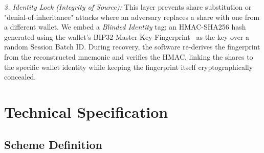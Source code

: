 \documentclass[11pt]{article}
\begin{document}
\textit{3. Identity Lock (Integrity of Source):} This layer prevents share substitution or "denial-of-inheritance" attacks where an adversary replaces a share with one from a different wallet. We embed a \textit{Blinded Identity} tag: an HMAC-SHA256 hash~\cite{rfc2104} generated using the wallet's BIP32 Master Key Fingerprint~\cite{bip32} as the key over a random Session Batch ID. During recovery, the software re-derives the fingerprint from the reconstructed mnemonic and verifies the HMAC, linking the shares to the specific wallet identity while keeping the fingerprint itself cryptographically concealed.

\section{Technical Specification}
\label{sec:technical}

\subsection{Scheme Definition}
\label{sec:scheme-def}
\end{document}
